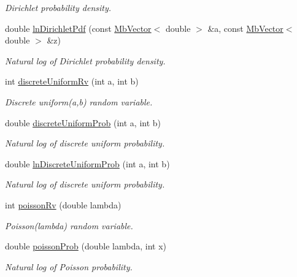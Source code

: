 \begin{DoxyCompactItemize}
\begin{DoxyCompactList}\small\item\em Dirichlet probability density. \end{DoxyCompactList}\item 
double \mbox{\hyperlink{class_mb_random_af4159ebe2cf7f73331f4087ce3ce1a15}{ln\+Dirichlet\+Pdf}} (const \mbox{\hyperlink{class_mb_vector}{Mb\+Vector}}$<$ double $>$ \&a, const \mbox{\hyperlink{class_mb_vector}{Mb\+Vector}}$<$ double $>$ \&z)
\begin{DoxyCompactList}\small\item\em Natural log of Dirichlet probability density. \end{DoxyCompactList}\item 
int \mbox{\hyperlink{class_mb_random_a0088ae321ad8b45bc36b18ae9d4b2896}{discrete\+Uniform\+Rv}} (int a, int b)
\begin{DoxyCompactList}\small\item\em Discrete uniform(a,b) random variable. \end{DoxyCompactList}\item 
double \mbox{\hyperlink{class_mb_random_a59af6e67ee8e16ea0f0269ee803bb258}{discrete\+Uniform\+Prob}} (int a, int b)
\begin{DoxyCompactList}\small\item\em Natural log of discrete uniform probability. \end{DoxyCompactList}\item 
double \mbox{\hyperlink{class_mb_random_a80fbc24c9c2f2f95a1cf7b4d3d47f9cf}{ln\+Discrete\+Uniform\+Prob}} (int a, int b)
\begin{DoxyCompactList}\small\item\em Natural log of discrete uniform probability. \end{DoxyCompactList}\item 
int \mbox{\hyperlink{class_mb_random_a1bdf06beaf449852a1b5247a79246b5f}{poisson\+Rv}} (double lambda)
\begin{DoxyCompactList}\small\item\em Poisson(lambda) random variable. \end{DoxyCompactList}\item 
double \mbox{\hyperlink{class_mb_random_a5ecfd1d9b7c3c426842b27d82b37d524}{poisson\+Prob}} (double lambda, int x)
\begin{DoxyCompactList}\small\item\em Natural log of Poisson probability. \end{DoxyCompactList}\item 

\end{DoxyCompactItemize}

